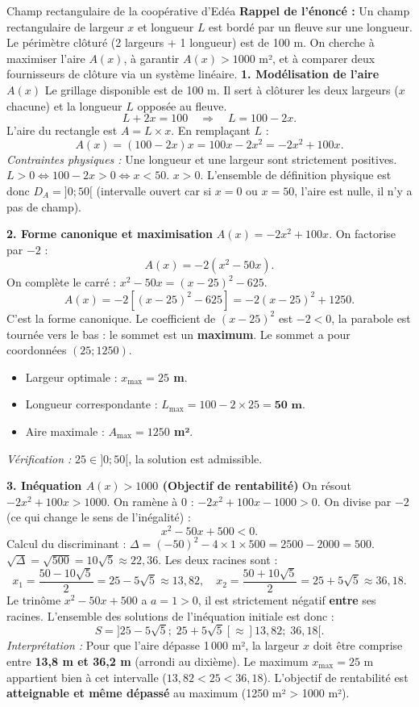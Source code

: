 \documentclass[11pt]{article}
\newcounter{popsec}
\newcounter{popsub}
\newcommand{\courssub}[1]{%
  \stepcounter{popsub}%
  \par\vspace{9pt}\noindent{\popxbold\fontsize{11.5}{13}\selectfont\color{popink}{\color{poporange}\thepopsec.\thepopsub}\hspace{6pt}#1}\par\nopagebreak\vspace{4pt}
}
\begin{document}
\courssub{Démarche et corrigé commenté}
\begin{exoresolu}{Champ rectangulaire de la coopérative d'Edéa}
\textbf{Rappel de l'énoncé :} Un champ rectangulaire de largeur $x$ et longueur $L$ est bordé par un fleuve sur une longueur. Le périmètre clôturé (2 largeurs + 1 longueur) est de 100 m. On cherche à maximiser l'aire $A(x)$, à garantir $A(x) > 1000$ m², et à comparer deux fournisseurs de clôture via un système linéaire.
\tcblower
\textbf{1. Modélisation de l'aire $A(x)$}
Le grillage disponible est de 100 m. Il sert à clôturer les deux largeurs ($x$ chacune) et la longueur $L$ opposée au fleuve.
\[
L + 2x = 100 \quad \Rightarrow \quad L = 100 - 2x.
\]
L'aire du rectangle est $A = L \times x$. En remplaçant $L$ :
\[
A(x) = (100 - 2x)x = 100x - 2x^2 = -2x^2 + 100x.
\]
\emph{Contraintes physiques :} Une longueur et une largeur sont strictement positives.
$L > 0 \iff 100 - 2x > 0 \iff x < 50$.
$x > 0$.
L'ensemble de définition physique est donc \textbf{$D_A = ]0; 50[$} (intervalle ouvert car si $x=0$ ou $x=50$, l'aire est nulle, il n'y a pas de champ).

\textbf{2. Forme canonique et maximisation}
$A(x) = -2x^2 + 100x$. On factorise par $-2$ :
\[
A(x) = -2(x^2 - 50x).
\]
On complète le carré : $x^2 - 50x = (x - 25)^2 - 625$.
\[
A(x) = -2\left[(x - 25)^2 - 625\right] = -2(x - 25)^2 + 1250.
\]
C'est la forme canonique. Le coefficient de $(x-25)^2$ est $-2 < 0$, la parabole est tournée vers le bas : le sommet est un \textbf{maximum}.
Le sommet a pour coordonnées $(25; 1250)$.
\begin{itemize}
    \item Largeur optimale : \textbf{$x_{\text{max}} = 25$ m}.
    \item Longueur correspondante : $L_{\text{max}} = 100 - 2 \times 25 = \textbf{50 m}$.
    \item Aire maximale : \textbf{$A_{\text{max}} = 1250$ m²}.
\end{itemize}
\emph{Vérification :} $25 \in ]0; 50[$, la solution est admissible.

\textbf{3. Inéquation $A(x) > 1000$ (Objectif de rentabilité)}
On résout $-2x^2 + 100x > 1000$.
On ramène à 0 : $-2x^2 + 100x - 1000 > 0$.
On divise par $-2$ (ce qui change le sens de l'inégalité) :
\[
x^2 - 50x + 500 < 0.
\]
Calcul du discriminant : $\Delta = (-50)^2 - 4 \times 1 \times 500 = 2500 - 2000 = 500$.
$\sqrt{\Delta} = \sqrt{500} = 10\sqrt{5} \approx 22,36$.
Les deux racines sont :
\[
x_1 = \frac{50 - 10\sqrt{5}}{2} = 25 - 5\sqrt{5} \approx 13,82,
\quad
x_2 = \frac{50 + 10\sqrt{5}}{2} = 25 + 5\sqrt{5} \approx 36,18.
\]
Le trinôme $x^2 - 50x + 500$ a $a=1 > 0$, il est strictement négatif \textbf{entre} ses racines.
L'ensemble des solutions de l'inéquation initiale est donc :
\[
S = ]25 - 5\sqrt{5};\; 25 + 5\sqrt{5}[ \approx ]13,82;\; 36,18[.
\]
\emph{Interprétation :} Pour que l'aire dépasse 1\,000 m², la largeur $x$ doit être comprise entre \textbf{13,8 m et 36,2 m} (arrondi au dixième).
Le maximum $x_{\text{max}} = 25$ m appartient bien à cet intervalle ($13,82 < 25 < 36,18$). L'objectif de rentabilité est \textbf{atteignable et même dépassé} au maximum (1250 m² > 1000 m²).


\end{exoresolu}
\end{document}
